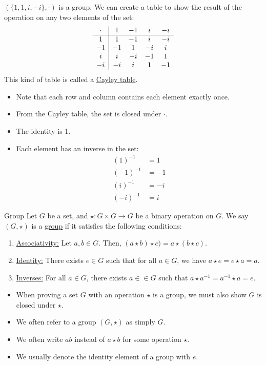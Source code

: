 \documentclass[12pt]{article}
\newcommand{\inv}{^{-1}}
\begin{document}
	\begin{myex}{}{}
		$(\{1, 1, i, -i\}, \cdot)$ is a group. We can create a table to show the result of the operation on any two elements of the set:
		\begin{align*}
			\begin{array}{c | cccc}
			\cdot & 1  & -1 & i  & -i \\
			\hline
			1     & 1  & -1 & i  & -i \\
			-1    & -1 & 1  & -i & i  \\
			i     & i  & -i & -1 & 1  \\
			-i    & -i & i  & 1  & -1
			\end{array}
		\end{align*}
		This kind of table is called a \underline{Cayley table}.
		\begin{itemize}
			\item Note that each row and column contains each element exactly once.
			\item From the Cayley table, the set is closed under $\cdot$.
			\item The identity is 1.
			\item Each element has an inverse in the set:\begin{align*}
				(1)\inv&=1\\
				(-1)\inv&=-1\\
				(i)\inv&=-i\\
				(-i)\inv&=i
			\end{align*}
		\end{itemize}
	\end{myex}
	
	\begin{mydef}{Group}{}
		Let $G$ be a set, and $\star:G\times G\to G$ be a binary operation on $G$. We say $(G, \star)$ is a \underline{group} if it satisfies the following conditions:
		\begin{enumerate}[label=(\roman*)]
			\item \underline{Associativity:} Let $a, b\in G$. Then, $(a\star b)\star c)=a\star(b\star c)$.
			\item \underline{Identity:} There exists $e\in G$ such that for all $a\in G$, we have $a\star e=e\star a=a$.
			\item \underline{Inverses:} For all $a\in G$, there exists $a\in\in G$ such that $a\star a\inv=a\inv\star a=e$.
		\end{enumerate}
	\end{mydef}
	
	\begin{myrem}{}{}
		\begin{itemize}
			\item When proving a set $G$ with an operation $\star$ is a group, we must also show $G$ is closed under $\star$.
			\item We often refer to a group $(G, \star)$ as simply $G$.
			\item We often write $ab$ instead of $a\star b$ for some operation $\star$.
			\item We usually denote the identity element of a group with $e$.
		\end{itemize}			
	\end{myrem}
	
\end{document}
